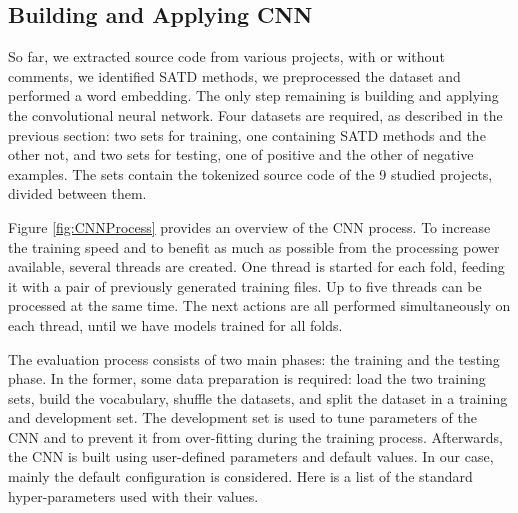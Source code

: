 \subsection{Building and Applying CNN}


So far, we extracted source code from various projects, with or without comments, we identified SATD methods, we preprocessed the dataset and performed a word embedding. The only step remaining is building and applying the convolutional neural network. Four datasets are required, as described in the previous section: two sets for training, one containing SATD methods and the other not, and two sets for testing, one of positive and the other of negative examples. The sets contain the tokenized source code of the 9 studied projects, divided between them.

Figure \ref{fig:CNNProcess} provides an overview of the CNN process. To increase the training speed and to benefit as much as possible from the processing power available, several threads are created. One thread is started for each fold, feeding it with a pair of previously generated training files. Up to five threads can be processed at the same time. The next actions are all performed simultaneously on each thread, until we have models trained for all folds. 

The evaluation process consists of two main phases: the training and the testing phase. In the former, some data preparation is required: load the two training sets, build the vocabulary, shuffle the datasets, and split the dataset in a training and development set. The development set is used to tune parameters of the CNN and to prevent it from over-fitting during the training process. Afterwards, the CNN is built using user-defined parameters and default values. In our case, mainly the default configuration is considered. Here is a list of the standard hyper-parameters used with their values.

\newpage

